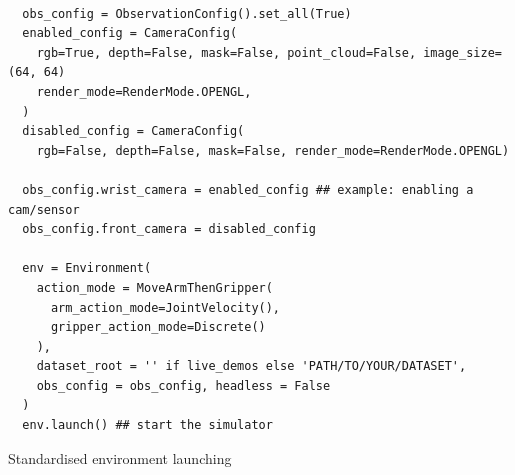 \begin{listing}[H]
  \begin{verbatim}

  obs_config = ObservationConfig().set_all(True) 
  enabled_config = CameraConfig(
    rgb=True, depth=False, mask=False, point_cloud=False, image_size=(64, 64)
    render_mode=RenderMode.OPENGL,
  )
  disabled_config = CameraConfig(
    rgb=False, depth=False, mask=False, render_mode=RenderMode.OPENGL)

  obs_config.wrist_camera = enabled_config ## example: enabling a cam/sensor
  obs_config.front_camera = disabled_config

  env = Environment(
    action_mode = MoveArmThenGripper(
      arm_action_mode=JointVelocity(), 
      gripper_action_mode=Discrete()
    ),
    dataset_root = '' if live_demos else 'PATH/TO/YOUR/DATASET',
    obs_config = obs_config, headless = False
  )
  env.launch() ## start the simulator
  \end{verbatim}
  \caption{Standardised environment launching}\label{lst:env-setup}
\end{listing}